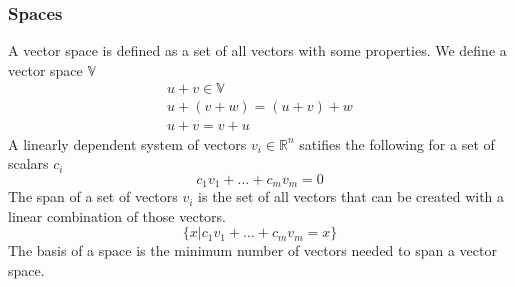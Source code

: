 \subsubsection{Spaces}
A vector space is defined as a set of all vectors with some properties. We define a vector space $\mathbb{V}$
\begin{gather}
    u + v \in \mathbb{V} \\
    u + (v +w) = (u+v) + w \\
    u + v = v+ u 
\end{gather}
A linearly dependent system of vectors $v_i \in \mathbb{R}^n$ satifies the following for a set of scalars $c_i$
\begin{equation}
    c_1 v_1 + \dots + c_m v_m = 0
\end{equation}
The span of a set of vectors $v_i$ is the set of all vectors that can be created with a linear combination of those vectors.
\begin{equation}
    \{ x | c_1 v_1 + \dots + c_m  v_m = x  \}
\end{equation}
The basis of a space is the minimum number of vectors needed to span a vector space.
